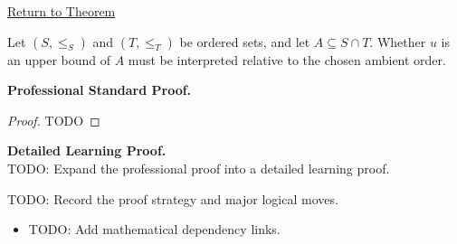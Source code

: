 \newpage
{}
\label{prf:upper-bounds-ambient-order}

\begin{remark*}[Return]
\hyperref[prop:upper-bounds-ambient-order]{Return to Theorem}
\end{remark*}

\begin{theorem*}
Let $(S,\le_S)$ and $(T,\le_T)$ be ordered sets, and let $A\subseteq S\cap T$. Whether $u$ is an upper bound of $A$ must be interpreted relative to the chosen ambient order.
\end{theorem*}

\textbf{Professional Standard Proof.}~\\
\begin{proof}
TODO
\end{proof}

\textbf{Detailed Learning Proof.}~\\
TODO: Expand the professional proof into a detailed learning proof.

\begin{remark*}
TODO: Record the proof strategy and major logical moves.
\end{remark*}

\begin{dependencies}
\begin{itemize}
  \item TODO: Add mathematical dependency links.
\end{itemize}
\end{dependencies}
